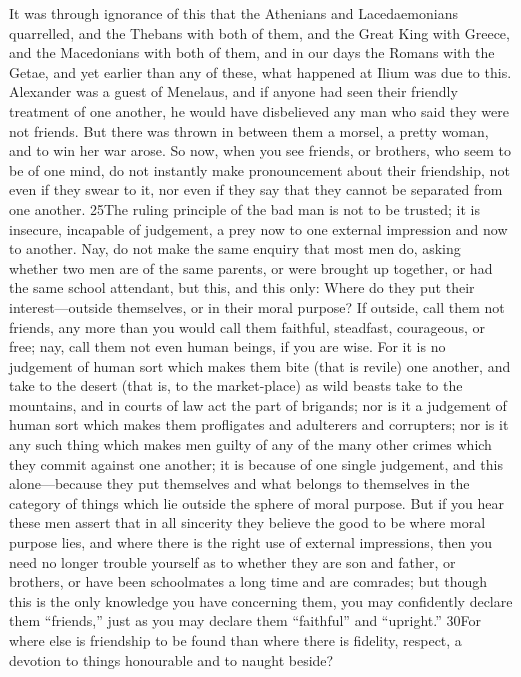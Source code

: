It was through ignorance of this that the Athenians and Lacedaemonians quarrelled, and the Thebans with both of them, and the Great King with Greece, and the Macedonians with both of them, and in our days the Romans with the Getae, and yet earlier than any of these, what happened at Ilium was due to this. Alexander was a guest of Menelaus, and if anyone had seen their friendly treatment of one another, he would have disbelieved any man who said they were not friends. But there was thrown in between them a morsel, a pretty woman, and to win her war arose. So now, when you see friends, or brothers, who seem to be of one mind, do not instantly make pronouncement about their friendship, not even if they swear to it, nor even if they say that they cannot be separated from one another. 25The ruling principle of the bad man is not to be trusted; it is insecure, incapable of judgement, a prey now to one external impression and now to another. Nay, do not make the same enquiry that most men do, asking whether two men are of the same parents, or were brought up together, or had the same school attendant, but this, and this only: Where do they put their interest—outside themselves, or in their moral purpose? If outside, call them not friends, any more than you would call them faithful, steadfast, courageous, or free; nay, call them not even human beings, if you are wise. For it is no judgement of human sort which makes them bite (that is revile) one another, and take to the desert (that is, to the market-place) as wild beasts take to the mountains, and in courts of law act the part of brigands; nor is it a judgement of human sort which makes them profligates and adulterers and corrupters; nor is it any such thing which makes men guilty of any of the many other crimes which they commit against one another; it is because of one single judgement, and this alone—because they put themselves and what belongs to themselves in the category of things which lie outside the sphere of moral purpose. But if you hear these men assert that in all sincerity they believe the good to be where moral purpose lies, and where there is the right use of external impressions, then you need no longer trouble yourself as to whether they are son and father, or brothers, or have been schoolmates a long time and are comrades; but though this is the only knowledge you have concerning them, you may confidently declare them ``friends,'' just as you may declare them ``faithful'' and ``upright.'' 30For where else is friendship to be found than where there is fidelity, respect, a devotion to things honourable and to naught beside?

